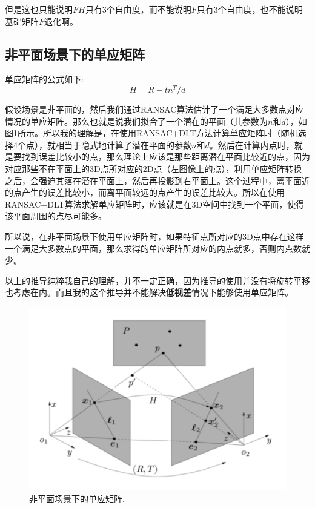 \begin{note}
但是这也只能说明$FH$只有3个自由度，而不能说明$F$只有3个自由度，也不能说明基础矩阵$F$退化啊。
\end{note}


\subsection{非平面场景下的单应矩阵}

单应矩阵的公式如下:
\begin{equation}
	H = R - tn^T / d
\end{equation}

假设场景是非平面的，然后我们通过RANSAC算法估计了一个满足大多数点对应情况的单应矩阵。那么也就是说我们拟合了一个潜在的平面（其参数为$n$和$d$），如图\ref{fig:nonplanar_homography}所示。所以我的理解是，在使用RANSAC+DLT方法计算单应矩阵时（随机选择4个点），就相当于隐式地计算了潜在平面的参数$n$和$d$。然后在计算内点时，就是要找到误差比较小的点，那么理论上应该是那些距离潜在平面比较近的点，因为对应那些不在平面上的3D点所对应的2D点（左图像上的点），利用单应矩阵转换之后，会强迫其落在潜在平面上，然后再投影到右平面上。这个过程中，离平面近的点产生的误差比较小，而离平面较远的点产生的误差比较大。所以在使用RANSAC+DLT算法求解单应矩阵时，应该就是在3D空间中找到一个平面，使得该平面周围的点尽可能多。


所以说，在非平面场景下使用单应矩阵时，如果特征点所对应的3D点中存在这样一个满足大多数点的平面，那么求得的单应矩阵所对应的内点就多，否则内点数就少。

\begin{note}
	以上的推导纯粹我自己的理解，并不一定正确，因为推导的使用并没有将旋转平移也考虑在内。而且我的这个推导并不能解决\textbf{低视差}情况下能够使用单应矩阵。
\end{note}

\begin{figure}[h]%
	\centering  %
	\includegraphics[width=0.6\linewidth]{image/Multiview-Geometry-Base/nonplanar_homography.png}  %
	\caption{非平面场景下的单应矩阵.}  %
	\label{fig:nonplanar_homography}   %
\end{figure}



